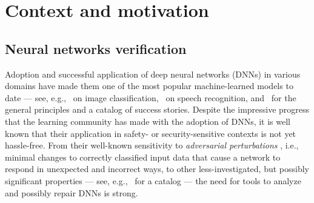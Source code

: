 \section{Context and motivation}
\label{sec:context}

\subsection{Neural networks verification}

Adoption and successful application of deep neural networks (DNNs) in various 
domains have made them one of the most popular machine-learned models to date 
--- see, e.g.,~\cite{DBLP:conf/cvpr/TaigmanYRW14} on image 
classification,~\cite{DBLP:journals/taslp/YuHMCS12} on speech recognition,
and~\cite{DBLP:journals/nature/LeCunBH15} for the general principles and a 
catalog of success stories. Despite the impressive progress that the learning 
community has made with the adoption of DNNs, it is well known that their 
application in safety- or security-sensitive contexts is not yet hassle-free. 
From their well-known sensitivity to \textit{adversarial perturbations}
\cite{DBLP:journals/corr/GoodfellowSS14,DBLP:journals/corr/SzegedyZSBEGF13}, 
i.e., minimal changes to correctly classified input data that cause a network 
to respond in unexpected and incorrect ways, to other less-investigated, but 
possibly significant properties --- see, 
e.g.,~\cite{DBLP:journals/corr/abs-1805-09938} for a catalog 
--- the need for tools to analyze and possibly repair DNNs is strong.

